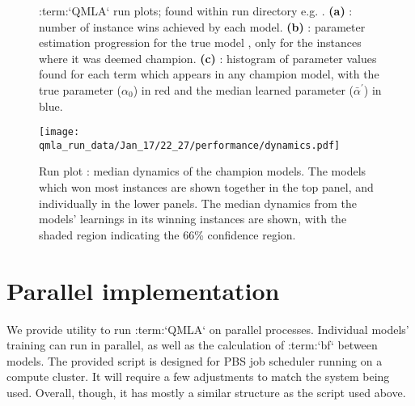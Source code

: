 \begin{figure}[H]
    \begin{center}
        \qquad
        \qquad
    \end{center}
    \caption[Run plots]{
        :term:`QMLA` run plots; found within run directory e.g. . 
        \textbf{(a)} : number of instance wins achieved by each model. 
        \textbf{(b)} : 
            parameter estimation progression for the  true model , only for the instances where it was deemed champion. 
        \textbf{(c)} : 
            histogram of parameter values found for each term which appears in any champion model,
            with the true parameter ($\alpha_0$) in red and the median learned parameter ($\bar{\alpha}^{\prime}$) in blue.
    }
    \label{fig:run_plots}
\end{figure}

\begin{figure}[H]
    \begin{center}
        \texttt{[image: qmla\_run\_data/Jan\_17/22\_27/performance/dynamics.pdf]}
    \end{center}
    \caption[Run plot: dynamics]{
        Run plot : median dynamics of the champion models. 
        The models which won most instances are shown together in the top panel, 
        and individually in the lower panels. 
        The median dynamics from the models' learnings in its winning instances are shown, 
        with the shaded region indicating the 66\% confidence region. 
    }
    \label{fig:run_dynamics}
\end{figure}



\section{Parallel implementation}
We provide utility to run :term:`QMLA` on parallel processes. 
Individual models' training can run in parallel, as well as the calculation of :term:`bf` between models. 
The provided script is designed for PBS job scheduler running on a compute cluster. 
It will require a few adjustments to match the system being used. 
Overall, though, it has mostly a similar structure as the  script used above. 
\par 

